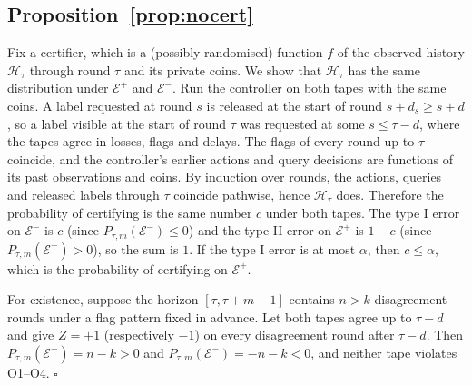 \documentclass[10pt]{article}
\theoremstyle{plain}
\theoremstyle{definition}
\begin{document}
\subsection{Proposition~\ref{prop:nocert}}
Fix a certifier, which is a (possibly randomised) function $f$ of the observed history $\mathcal H_\tau$ through round $\tau$ and its private coins. We show that $\mathcal H_\tau$ has the same distribution under $\mathcal E^+$ and $\mathcal E^-$. Run the controller on both tapes with the same coins. A label requested at round $s$ is released at the start of round $s+d_s\ge s+d$, so a label visible at the start of round $\tau$ was requested at some $s\le\tau-d$, where the tapes agree in losses, flags and delays. The flags of every round up to $\tau$ coincide, and the controller's earlier actions and query decisions are functions of its past observations and coins. By induction over rounds, the actions, queries and released labels through $\tau$ coincide pathwise, hence $\mathcal H_\tau$ does. Therefore the probability of certifying is the same number $c$ under both tapes. The type I error on $\mathcal E^-$ is $c$ (since $P_{\tau,m}(\mathcal E^-)\le0$) and the type II error on $\mathcal E^+$ is $1-c$ (since $P_{\tau,m}(\mathcal E^+)>0$), so the sum is $1$. If the type I error is at most $\alpha$, then $c\le\alpha$, which is the probability of certifying on $\mathcal E^+$.

For existence, suppose the horizon $[\tau,\tau+m-1]$ contains $n>k$ disagreement rounds under a flag pattern fixed in advance. Let both tapes agree up to $\tau-d$ and give $Z=+1$ (respectively $-1$) on every disagreement round after $\tau-d$. Then $P_{\tau,m}(\mathcal E^+)=n-k>0$ and $P_{\tau,m}(\mathcal E^-)=-n-k<0$, and neither tape violates O1--O4. $\square$
\end{document}
